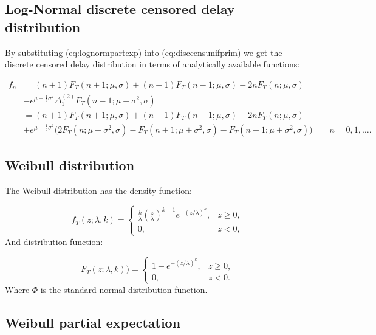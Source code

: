 \documentclass[10pt,letterpaper]{article}
\begin{document}
\subsection{Log-Normal discrete censored delay distribution}

By substituting \@ref(eq:lognormpartexp) into \@ref(eq:disccensunifprim) we get the discrete censored delay distribution in terms of analytically available functions:

\begin{equation}
\begin{aligned}
f_n &= (n+1) F_T(n+1; \mu, \sigma) + (n-1) F_T(n-1; \mu, \sigma) - 2 n F_T(n; \mu, \sigma) \\
 &- e^{\mu + \frac{1}{2} \sigma^2} \Delta_1^{(2)}F_T(n-1;\mu + \sigma^2, \sigma) \\
 &= (n+1) F_T(n+1; \mu, \sigma) + (n-1) F_T(n-1; \mu, \sigma) - 2 n F_T(n; \mu, \sigma) \\
  &+ e^{\mu + \frac{1}{2} \sigma^2} \Big( 2 F_T(n; \mu + \sigma^2, \sigma) - F_T(n+1; \mu + \sigma^2, \sigma) - F_T(n-1; \mu + \sigma^2, \sigma)  \Big)\qquad n = 0, 1, \dots.
\end{aligned}
\end{equation}

\subsection{Weibull distribution}

The Weibull distribution has the density function:

\begin{equation}
f_T(z;\lambda,k) =
\begin{cases}
\frac{k}{\lambda}\left(\frac{z}{\lambda}\right)^{k-1}e^{-(z/\lambda)^{k}}, & z\geq0 ,\\
0, & z<0,
\end{cases}
\end{equation}
And distribution function:

\begin{equation}
F_T(z;\lambda,k))=\begin{cases}1 - e^{-(z/\lambda)^k}, & z\geq0,\\ 0, & z<0.\end{cases}
\end{equation}
Where $\Phi$ is the standard normal distribution function.

\subsection{Weibull partial expectation}
\end{document}
